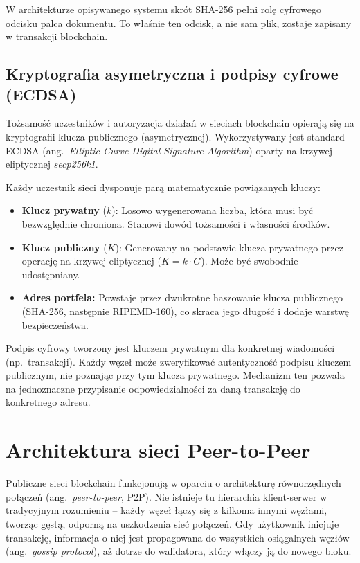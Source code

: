 \documentclass[12pt,a4paper,twoside]{report}
\begin{document}
W architekturze opisywanego systemu skrót SHA-256 pełni rolę cyfrowego odcisku palca
dokumentu. To właśnie ten odcisk, a nie sam plik, zostaje zapisany w transakcji
blockchain.

\subsection{Kryptografia asymetryczna i podpisy cyfrowe (ECDSA)}

Tożsamość uczestników i autoryzacja działań w sieciach blockchain opierają się na
kryptografii klucza publicznego (asymetrycznej). Wykorzystywany jest standard ECDSA
(ang.~\textit{Elliptic Curve Digital Signature Algorithm}) oparty na krzywej eliptycznej
\textit{secp256k1}.

Każdy uczestnik sieci dysponuje parą matematycznie powiązanych kluczy:
\begin{itemize}
    \item \textbf{Klucz prywatny} (\(k\)): Losowo wygenerowana liczba, która musi być
          bezwzględnie chroniona. Stanowi dowód tożsamości i własności środków.
    \item \textbf{Klucz publiczny} (\(K\)): Generowany na podstawie klucza prywatnego
          przez operację na krzywej eliptycznej (\(K = k \cdot G\)). Może być swobodnie
          udostępniany.
    \item \textbf{Adres portfela:} Powstaje przez dwukrotne haszowanie klucza publicznego
          (SHA-256, następnie RIPEMD-160), co skraca jego długość i dodaje warstwę
          bezpieczeństwa.
\end{itemize}

Podpis cyfrowy tworzony jest kluczem prywatnym dla konkretnej wiadomości (np.~transakcji).
Każdy węzeł może zweryfikować autentyczność podpisu kluczem publicznym, nie poznając
przy tym klucza prywatnego. Mechanizm ten pozwala na jednoznaczne przypisanie
odpowiedzialności za daną transakcję do konkretnego adresu.

\section{Architektura sieci Peer-to-Peer}

Publiczne sieci blockchain funkcjonują w oparciu o architekturę równorzędnych połączeń
(ang.~\textit{peer-to-peer}, P2P). Nie istnieje tu hierarchia klient-serwer w tradycyjnym
rozumieniu -- każdy węzeł łączy się z kilkoma innymi węzłami, tworząc gęstą, odporną na
uszkodzenia sieć połączeń. Gdy użytkownik inicjuje transakcję, informacja o niej jest
propagowana do wszystkich osiągalnych węzłów (ang.~\textit{gossip protocol}), aż dotrze
do walidatora, który włączy ją do nowego bloku.
\end{document}
